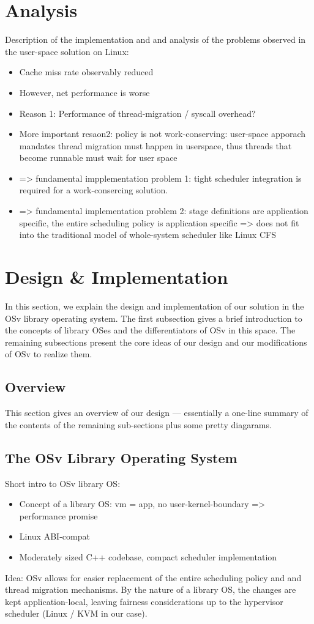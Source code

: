 \documentclass[12pt,a4paper]{article}
\begin{document}
\section{Analysis}
Description of the implementation and and analysis of the problems observed in the user-space solution on Linux:
\begin{itemize}
    \item Cache miss rate observably reduced
    \item However, net performance is worse
    \item Reason 1: Performance of thread-migration / syscall overhead?
    \item More important resaon2: policy is not work-conserving:
        user-space apporach mandates thread migration must happen in userspace,
        thus threads that become runnable must wait for user space
    \item => fundamental impplementation problem 1: tight scheduler integration is required for a work-consercing solution.
    \item => fundamental implementation problem 2: stage definitions are application specific, the entire scheduling policy is application specific => does not fit into the traditional model of whole-system scheduler like Linux CFS
\end{itemize}

\clearpage

\section{Design \& Implementation}
In this section, we explain the design and implementation of our solution in the OSv library operating system.
The first subsection gives a brief introduction to the concepts of library OSes and the differentiators of OSv in this space.
The remaining subsections present the core ideas of our design and our modifications of OSv to realize them.

\subsection{Overview}
This section gives an overview of our design --- essentially a one-line summary of the contents of the remaining sub-sections plus some pretty diagarams.

\subsection{The OSv Library Operating System}
Short intro to OSv library OS:
\begin{itemize}
    \item Concept of a library OS: vm = app, no user-kernel-boundary => performance promise
    \item Linux ABI-compat
    \item Moderately sized C++ codebase, compact scheduler implementation
\end{itemize}
Idea: OSv allows for easier replacement of the entire scheduling policy and and thread migration mechanisms.
By the nature of a library OS, the changes are kept application-local, leaving fairness considerations up to the hypervisor scheduler (Linux / KVM in our case).
\end{document}
